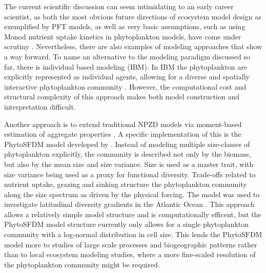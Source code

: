 The current scientific discussion can seem intimidating to an early career scientist, as both the most obvious future directions of ecosystem model design as exemplified by PFT models, as well as very basic assumptions, such as using Monod nutrient uptake kinetics in phytoplankton models, have come under scrutiny \citep{Flynn2010, Smith2014, Hellweger2017a}.
Nevertheless, there are also examples of modeling approaches that show a way forward. To name an alternative to the modeling paradigm discussed so far, there is individual based modeling (IBM). In IBM the phytoplankton are explicitly represented as individual agents, allowing for a diverse and spatially interactive phytoplankton community \citep{Hellweger2009}. However, the computational cost and structural complexity of this approach makes both model construction and interpretation difficult. 

Another approach is to extend traditional NPZD models via moment-based estimation of aggregate properties \citep{Merico2009}. A specific implementation of this is the PhytoSFDM model developed by \citet{Acevedo-Trejos2016}. Instead of modeling multiple size-classes of phytoplankton explicitly, the community is described not only by the biomass, but also by the mean size and size variance. Size is used as a master trait, with size variance being used as a proxy for functional diversity. Trade-offs related to nutrient uptake, grazing and sinking structure the phytoplankton community along the size spectrum as driven by the physical forcing. The model was used to investigate latitudinal diversity gradients in the Atlantic Ocean \citep{Acevedo-Trejos2018}. This approach allows a relatively simple model structure and is computationally efficent, but the PhytoSFDM model structure currently only allows for a single phytoplankton community with a log-normal distribution in cell size. This lends the PhytoSFDM model more to studies of large scale processes and biogeographic patterns rather than to local ecosystem modeling studies, where a more fine-scaled resolution of the phytoplankton community might be required.

